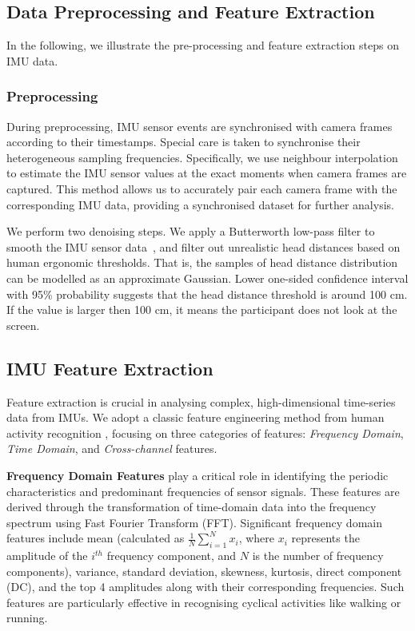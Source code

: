 \subsection{Data Preprocessing and Feature Extraction}
In the following, we illustrate the pre-processing and feature extraction steps on IMU data.

\subsubsection{Preprocessing}\label{subsec:preprocessing}

During preprocessing, IMU sensor events are synchronised with camera frames according to their timestamps. Special care is taken to synchronise their heterogeneous sampling frequencies. Specifically, we use neighbour interpolation~\cite{lepot2017interpolation} to estimate the IMU sensor values at the exact moments when camera frames are captured. This method allows us to accurately pair each camera frame with the corresponding IMU data, providing a synchronised dataset for further analysis. 

We perform two denoising steps. We apply a Butterworth low-pass filter to smooth the IMU sensor data~\cite{anguita2013public}, and filter out unrealistic head distances based on human ergonomic thresholds. That is, the samples of head distance distribution can be modelled as an approximate Gaussian. Lower one-sided confidence interval with 95\% probability suggests that the head distance threshold is around 100 cm. If the value is larger then 100 cm, it means the participant does not look at the screen.


\subsection{IMU Feature Extraction}\label{subsec:feature}
Feature extraction is crucial in analysing complex, high-dimensional time-series data from IMUs. We adopt a classic feature engineering method from human activity recognition \cite{anguita2013public}, focusing on three categories of features: \textit{Frequency Domain}, \textit{Time Domain}, and \textit{Cross-channel} features.

\textbf{Frequency Domain Features} play a critical role in identifying the periodic characteristics and predominant frequencies of sensor signals. These features are derived through the transformation of time-domain data into the frequency spectrum using  Fast Fourier Transform (FFT). Significant frequency domain features include mean (calculated as $\frac{1}{N} \sum_{i=1}^{N} x_i$, where $x_i$ represents the amplitude of the $i^{th}$ frequency component, and $N$ is the number of frequency components), variance, standard deviation, skewness, kurtosis, direct component (DC), and the top 4 amplitudes along with their corresponding frequencies. Such features are particularly effective in recognising cyclical activities like walking or running.

